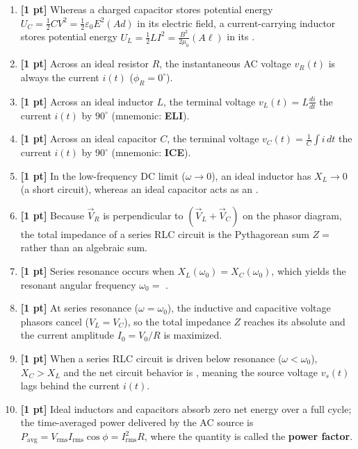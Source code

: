 \documentclass[10pt,letterpaper]{article}
\begin{document}
{{{\begin{enumerate}
  \item \textbf{[1 pt]} Whereas a charged capacitor stores potential energy $U_C = \frac{1}{2}CV^2 = \frac{1}{2}\varepsilon_0 E^2 (Ad)$ in its electric field, a current-carrying inductor stores potential energy $U_L = \frac{1}{2}LI^2 = \frac{B^2}{2\mu_0}(A\ell)$ in its \underline{\hspace{1.8in}}.
  \item \textbf{[1 pt]} Across an ideal resistor $R$, the instantaneous AC voltage $v_R(t)$ is always \underline{\hspace{1.8in}} the current $i(t)$ ($\phi_R = 0^\circ$).
  \item \textbf{[1 pt]} Across an ideal inductor $L$, the terminal voltage $v_L(t) = L\frac{di}{dt}$ \underline{\hspace{1.8in}} the current $i(t)$ by $90^\circ$ (mnemonic: \textbf{ELI}).
  \item \textbf{[1 pt]} Across an ideal capacitor $C$, the terminal voltage $v_C(t) = \frac{1}{C}\int i\,dt$ \underline{\hspace{1.8in}} the current $i(t)$ by $90^\circ$ (mnemonic: \textbf{ICE}).
  \item \textbf{[1 pt]} In the low-frequency DC limit ($\omega \to 0$), an ideal inductor has $X_L \to 0$ (a short circuit), whereas an ideal capacitor acts as an \underline{\hspace{1.8in}}.
  \item \textbf{[1 pt]} Because $\vec{V}_R$ is perpendicular to $(\vec{V}_L + \vec{V}_C)$ on the phasor diagram, the total impedance of a series RLC circuit is the Pythagorean sum $Z =$ \underline{\hspace{1.8in}} rather than an algebraic sum.
  \item \textbf{[1 pt]} Series resonance occurs when $X_L(\omega_0) = X_C(\omega_0)$, which yields the resonant angular frequency $\omega_0 =$ \underline{\hspace{1.8in}}.
  \item \textbf{[1 pt]} At series resonance ($\omega = \omega_0$), the inductive and capacitive voltage phasors cancel ($V_L = V_C$), so the total impedance $Z$ reaches its absolute \underline{\hspace{1.8in}} and the current amplitude $I_0 = V_0/R$ is maximized.
  \item \textbf{[1 pt]} When a series RLC circuit is driven below resonance ($\omega < \omega_0$), $X_C > X_L$ and the net circuit behavior is \underline{\hspace{1.8in}}, meaning the source voltage $v_s(t)$ lags behind the current $i(t)$.
  \item \textbf{[1 pt]} Ideal inductors and capacitors absorb zero net energy over a full cycle; the time-averaged power delivered by the AC source is $P_{\text{avg}} = V_{\text{rms}} I_{\text{rms}} \cos\phi = I_{\text{rms}}^2 R$, where the quantity \underline{\hspace{1.8in}} is called the \textbf{power factor}.
\end{enumerate}


}}}
\end{document}
